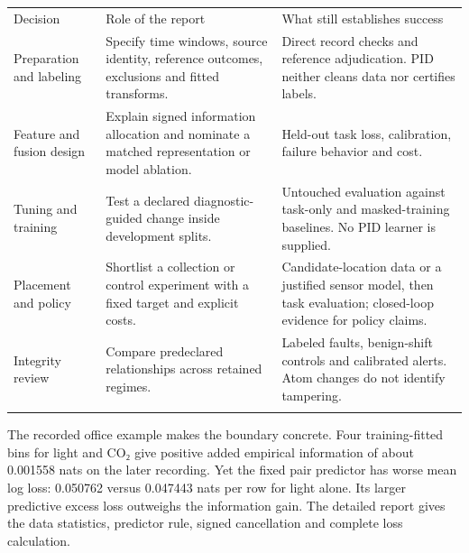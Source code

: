 \documentclass[11pt,a4paper]{article}
\newcounter{none}
\begin{document}
{\def\LTcaptype{none} %
\begin{longtable}[]{@{}
  >{\raggedright\arraybackslash}p{}
  >{\raggedright\arraybackslash}p{}
  >{\raggedright\arraybackslash}p{}@{}}
\toprule\noalign{}
\begin{minipage}[b]{\linewidth}\raggedright
Decision
\end{minipage} & \begin{minipage}[b]{\linewidth}\raggedright
Role of the report
\end{minipage} & \begin{minipage}[b]{\linewidth}\raggedright
What still establishes success
\end{minipage} \\*
\midrule\noalign{}
\endhead
\bottomrule\noalign{}
\endfoot
Preparation and labeling & Specify time windows, source identity, reference outcomes, exclusions and fitted transforms. & Direct record checks and reference adjudication. PID neither cleans data nor certifies labels. \\*
Feature and fusion design & Explain signed information allocation and nominate a matched representation or model ablation. & Held-out task loss, calibration, failure behavior and cost. \\*
Tuning and training & Test a declared diagnostic-guided change inside development splits. & Untouched evaluation against task-only and masked-training baselines. No PID learner is supplied. \\*
Placement and policy & Shortlist a collection or control experiment with a fixed target and explicit costs. & Candidate-location data or a justified sensor model, then task evaluation; closed-loop evidence for policy claims. \\*
Integrity review & Compare predeclared relationships across retained regimes. & Labeled faults, benign-shift controls and calibrated alerts. Atom changes do not identify tampering. \\*
\end{longtable}
}

The recorded office example makes the boundary concrete. Four training-fitted bins for light and CO₂ give positive added empirical information of about 0.001558 nats on the later recording. Yet the fixed pair predictor has worse mean log loss: 0.050762 versus 0.047443 nats per row for light alone. Its larger predictive excess loss outweighs the information gain. The detailed report gives the data statistics, predictor rule, signed cancellation and complete loss calculation.
\end{document}
